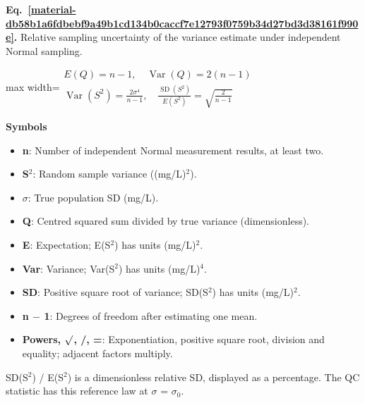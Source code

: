 \documentclass[11pt,a4paper]{article}
\begin{document}
\par\medskip
\noindent\begin{minipage}{\linewidth}
\label{material-db58b1a6fdbebf9a49b1cd134b0caccf7e12793f0759b34d27bd3d38161f990e}
\noindent\textbf{Eq.~\ref*{material-db58b1a6fdbebf9a49b1cd134b0caccf7e12793f0759b34d27bd3d38161f990e}.} Relative sampling uncertainty of the variance estimate under independent Normal sampling.\par\nopagebreak
\begin{center}\begin{adjustbox}{max width=\linewidth}$\displaystyle \begin{gathered}E(Q)=n-1,\quad\operatorname{Var}(Q)=2(n-1)\\\operatorname{Var}(S^2)=\frac{2\sigma^4}{n-1},\quad\frac{\operatorname{SD}(S^2)}{E(S^2)}=\sqrt{\frac{2}{n-1}}\end{gathered}$\end{adjustbox}\end{center}

\par\noindent\textbf{Symbols}

\begin{itemize}\setlength{\itemsep}{1pt}\setlength{\parsep}{0pt}
\item \textbf{n}: Number of independent Normal measurement results, at least two.
\item \textbf{S\ensuremath{{}^2}}: Random sample variance ((mg/L)\ensuremath{{}^2}).
\item \textbf{\ensuremath{\sigma}}: True population SD (mg/L).
\item \textbf{Q}: Centred squared sum divided by true variance (dimensionless).
\item \textbf{E}: Expectation; E(S\ensuremath{{}^2}) has units (mg/L)\ensuremath{{}^2}.
\item \textbf{Var}: Variance; Var(S\ensuremath{{}^2}) has units (mg/L)\ensuremath{{}^4}.
\item \textbf{SD}: Positive square root of variance; SD(S\ensuremath{{}^2}) has units (mg/L)\ensuremath{{}^2}.
\item \textbf{n \ensuremath{-} 1}: Degrees of freedom after estimating one mean.
\item \textbf{Powers, \ensuremath{\sqrt{\vphantom{x}}}, /, =}: Exponentiation, positive square root, division and equality; adjacent factors multiply.
\end{itemize}

SD(S\ensuremath{{}^2}) / E(S\ensuremath{{}^2}) is a dimensionless relative SD, displayed as a percentage. The QC statistic has this reference law at \ensuremath{\sigma} = \ensuremath{\sigma}\ensuremath{{}_0}.

\end{minipage}\par
\medskip
\end{document}
